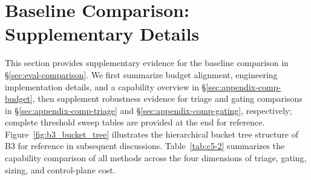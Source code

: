 \section{Baseline Comparison: Supplementary Details}

This section provides supplementary evidence for the baseline comparison in \S\ref{sec:eval-comparison}. We first summarize budget alignment, engineering implementation details, and a capability overview in \S\ref{sec:appendix-comp-budget}, then supplement robustness evidence for triage and gating comparisons in \S\ref{sec:appendix-comp-triage} and \S\ref{sec:appendix-comp-gating}, respectively; complete threshold sweep tables are provided at the end for reference.
Figure~\ref{fig:b3_bucket_tree} illustrates the hierarchical bucket tree structure of B3 for reference in subsequent discussions.
Table~\ref{tab:c5-2} summarizes the capability comparison of all methods across the four dimensions of triage, gating, sizing, and control-plane cost.




